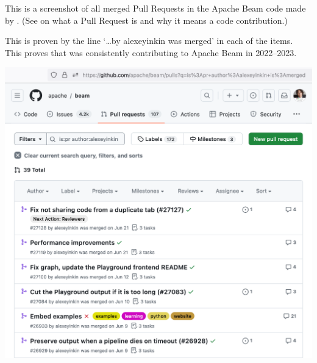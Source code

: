 
This is a screenshot of all merged Pull Requests in the Apache Beam code made by \mrl.
(See  on what a Pull Request is and why it means a code contribution.)

This is proven by the line `\dots by alexeyinkin was merged' in each of the items.
This proves that \mrl was consistently contributing to Apache Beam in 2022--2023.

\includegraphics[width=\textwidth]{github-prs-alexeyinkin-p1}
\WillContinue

\pagebreak

